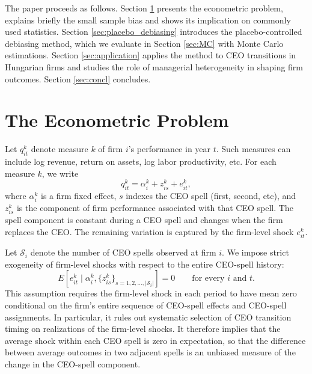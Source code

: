 \documentclass[sigconf,nonacm]{acmart}
\begin{document}
The paper proceeds as follows. Section \ref{sec:econometric_problem} presents the econometric problem, explains briefly the small sample bias and shows its implication on commonly used statistics. Section \ref{sec:placebo_debiasing} introduces the placebo-controlled debiasing method, which we evaluate in Section \ref{sec:MC} with Monte Carlo estimations. Section \ref{sec:application} applies the method to CEO transitions in Hungarian firms and studies the role of managerial heterogeneity in shaping firm outcomes. Section \ref{sec:concl} concludes.


\section{The Econometric Problem}\label{sec:econometric_problem}

Let $q_{it}^{k}$ denote measure $k$ of firm $i$'s performance in year
$t$. Such measures can include log
revenue, return on assets, log labor productivity, etc. For each measure
$k$, we write
\begin{equation}
q_{it}^{k}
=
\alpha_i^{k}
+
z_{is}^{k}
+
e_{it}^{k},
\label{eq:outcome_model}
\end{equation}
where $\alpha_i^{k}$ is a firm fixed effect, $s$ indexes the CEO
spell (first, second, etc), and $z_{is}^{k}$ is the component of firm performance associated with that CEO spell. The spell component is constant during a CEO spell and changes when the firm replaces the CEO. The remaining variation is captured by the firm-level
shock $e_{it}^{k}$.

Let $\mathcal S_i$ denote the number of CEO spells observed at firm $i$.
We impose strict exogeneity of firm-level shocks with respect to the entire CEO-spell history:
\begin{equation}
E\!\left[
e_{it}^{k}
\mid
\alpha_i^{k},
\{z_{is}^{k}\}_{s=1,2,...,|\mathcal S_i|}
\right]
=
0
\qquad
\text{for every $i$ and $t$}.
\label{eq:strict_exogeneity}
\end{equation}
This assumption requires the firm-level shock in each period to have
mean zero conditional on the firm's entire sequence of CEO-spell
effects and CEO-spell assignments. In particular, it rules out
systematic selection of CEO transition timing on realizations of the
firm-level shocks. It therefore implies that the average shock within
each CEO spell is zero in expectation, so that the difference between
average outcomes in two adjacent spells is an unbiased measure of the
change in the CEO-spell component.
\end{document}
